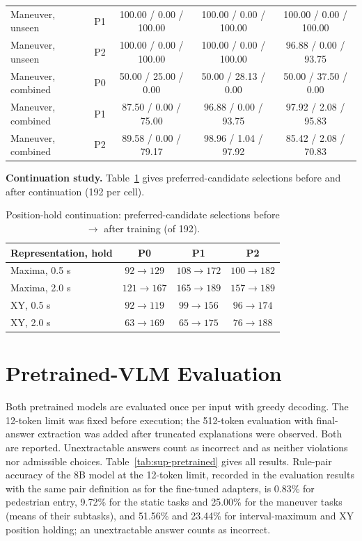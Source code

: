 \documentclass[10pt]{article}
\begin{document}
\begin{table}[tbp]
\begin{tabular}{llccc}
Maneuver, unseen & P1 & 100.00 / 0.00 / 100.00 & 100.00 / 0.00 / 100.00 & 100.00 / 0.00 / 100.00\\
Maneuver, unseen & P2 & 100.00 / 0.00 / 100.00 & 100.00 / 0.00 / 100.00 & 96.88 / 0.00 / 93.75\\
Maneuver, combined & P0 & 50.00 / 25.00 / 0.00 & 50.00 / 28.13 / 0.00 & 50.00 / 37.50 / 0.00\\
Maneuver, combined & P1 & 87.50 / 0.00 / 75.00 & 96.88 / 0.00 / 93.75 & 97.92 / 2.08 / 95.83\\
Maneuver, combined & P2 & 89.58 / 0.00 / 79.17 & 98.96 / 1.04 / 97.92 & 85.42 / 2.08 / 70.83\\
\bottomrule
\end{tabular}
\end{table}

\textbf{Continuation study.} Table~\ref{tab:sup-continuation} gives preferred-candidate selections before and after continuation (192 per cell).

\begin{table}[h]
\centering\footnotesize
\caption{Position-hold continuation: preferred-candidate selections before $\to$ after training (of 192).}
\label{tab:sup-continuation}
\begin{tabular}{lccc}
\toprule
Representation, hold & P0 & P1 & P2\\
\midrule
Maxima, 0.5 s & $92\to129$ & $108\to172$ & $100\to182$\\
Maxima, 2.0 s & $121\to167$ & $165\to189$ & $157\to189$\\
XY, 0.5 s & $92\to119$ & $99\to156$ & $96\to174$\\
XY, 2.0 s & $63\to169$ & $65\to175$ & $76\to188$\\
\bottomrule
\end{tabular}
\end{table}

\clearpage
\section{Pretrained-VLM Evaluation}\label{sup:pretrained}

Both pretrained models are evaluated once per input with greedy decoding.
The 12-token limit was fixed before execution; the 512-token evaluation with
final-answer extraction was added after truncated explanations were observed.
Both are reported. Unextractable answers count as incorrect and as neither
violations nor admissible choices. Table~\ref{tab:sup-pretrained} gives all
results. Rule-pair accuracy of the 8B model at the 12-token limit, recorded in the
evaluation results with the same pair definition as for the fine-tuned
adapters, is 0.83\% for pedestrian entry, 9.72\% for the static tasks and
25.00\% for the maneuver tasks (means of their subtasks), and 51.56\% and 23.44\% for interval-maximum and XY position
holding; an unextractable answer counts as incorrect.
\end{document}
